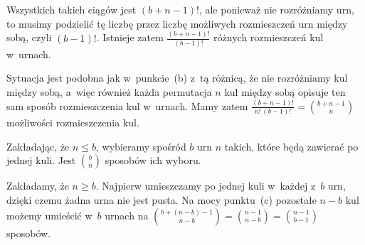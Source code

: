 Wszystkich takich ciągów jest $(b+n-1)!$, ale ponieważ nie rozróżniamy urn, to musimy podzielić tę liczbę przez liczbę możliwych rozmieszczeń urn między sobą, czyli $(b-1)!$. Istnieje zatem $\frac{(b+n-1)!}{(b-1)!}$ różnych rozmieszczeń kul w~urnach.

\subproblem %
Sytuacja jest podobna jak w~punkcie~(b) z~tą różnicą, że nie rozróżniamy kul między sobą, a~więc również każda permutacja $n$ kul między sobą opisuje ten sam sposób rozmieszczenia kul w~urnach. Mamy zatem $\frac{(b+n-1)!}{n!\,(b-1)!}=\binom{b+n-1}{n}$ możliwości rozmieszczenia kul.

\subproblem %
Zakładając, że $n\le b$, wybieramy spośród $b$ urn $n$ takich, które będą zawierać po jednej kuli. Jest $\binom{b}{n}$ sposobów ich wyboru.

\subproblem %
Zakładamy, że $n\ge b$. Najpierw umieszczamy po jednej kuli w~każdej z~$b$ urn, dzięki czemu żadna urna nie jest pusta. Na mocy punktu~(c) pozostałe $n-b$ kul możemy umieścić w~$b$ urnach na $\binom{b+(n-b)-1}{n-b}=\binom{n-1}{n-b}=\binom{n-1}{b-1}$ sposobów.

\endinput